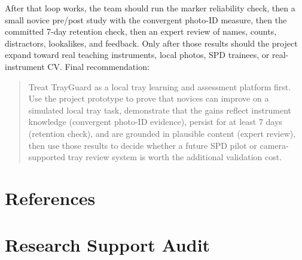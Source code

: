 \documentclass[10pt,a4paper]{article}
\begin{document}
After that loop works, the team should run the marker reliability check, then a
small novice pre/post study with the convergent photo-ID measure, then the
committed 7-day retention check, then an expert review of names, counts,
distractors, lookalikes, and feedback. Only after those results should the
project expand toward real teaching instruments, local photos, SPD trainees, or
real-instrument CV.
Final recommendation:
\begin{quote}
Treat TrayGuard as a local tray learning and assessment platform first. Use
the project prototype to prove that novices can improve on a simulated local tray
task, demonstrate that the gains reflect instrument knowledge (convergent
photo-ID evidence), persist for at least 7 days (retention check), and are
grounded in plausible content (expert review), then use those results to decide
whether a future SPD pilot or camera-supported tray review system is worth the
additional validation cost.
\end{quote}




\section{References}
\label{sec:references}
{\small
\raggedright

}

\appendix
\section{Research Support Audit}
\label{sec:appendix-a-research-support-audit}
\end{document}
